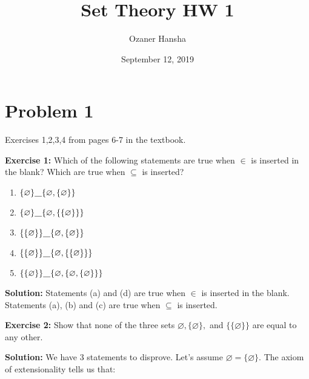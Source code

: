 \documentclass{article}
\begin{document}
\title{Set Theory HW 1}
\author{Ozaner Hansha}
\date{September 12, 2019}
\maketitle


\newcommand{\pset}[1]{\mathcal P(#1)}
\newcommand{\and}{\wedge}
\newcommand{\OR}{\vee}

\section*{Problem 1}
Exercises 1,2,3,4 from pages 6-7 in the textbook.
\bigskip

\noindent\textbf{Exercise 1:} Which of the following statements are true when $\in$ is inserted in the blank? Which are true when $\subseteq$ is inserted?

\begin{enumerate}[label=(\alph*)]
    \item $\{\varnothing\}\underline{\hspace{3mm}}\{\varnothing,\{\varnothing\}\}$
    \item $\{\varnothing\}\underline{\hspace{3mm}}\{\varnothing,\{\{\varnothing\}\}\}$
    \item $\{\{\varnothing\}\}\underline{\hspace{3mm}}\{\varnothing,\{\varnothing\}\}$
    \item $\{\{\varnothing\}\}\underline{\hspace{3mm}}\{\varnothing,\{\{\varnothing\}\}\}$
    \item $\{\{\varnothing\}\}\underline{\hspace{3mm}}\{\varnothing,\{\varnothing,\{\varnothing\}\}\}$
\end{enumerate}

\noindent\textbf{Solution:} Statements (a) and (d) are true when $\in$ is inserted in the blank. Statements (a), (b) and (c) are true when $\subseteq$ is inserted.
\bigskip

\noindent\textbf{Exercise 2:} Show that none of the three sets $\varnothing, \{\varnothing\},$ and $\{\{\varnothing\}\}$ are equal to any other.
\bigskip

\noindent\textbf{Solution:} We have 3 statements to disprove. Let's assume $\varnothing=\{\varnothing\}$. The axiom of extensionality tells us that:
\end{document}
